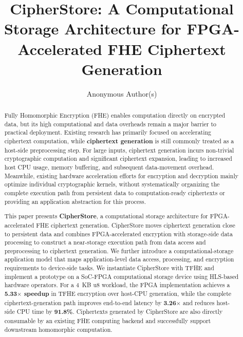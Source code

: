 \documentclass[sigconf,anonymous]{acmart}
\begin{document}
\title{CipherStore: A Computational Storage Architecture for FPGA-Accelerated FHE Ciphertext Generation}

\author{Anonymous Author(s)}

\begin{abstract}
Fully Homomorphic Encryption (FHE) enables computation directly on encrypted data, but its high computational and data overheads remain a major barrier to practical deployment. Existing research has primarily focused on accelerating ciphertext computation, while \textbf{ciphertext generation} is still commonly treated as a host-side preprocessing step. For large inputs, ciphertext generation incurs non-trivial cryptographic computation and significant ciphertext expansion, leading to increased host CPU usage, memory buffering, and subsequent data-movement overhead. Meanwhile, existing hardware acceleration efforts for encryption and decryption mainly optimize individual cryptographic kernels, without systematically organizing the complete execution path from persistent data to computation-ready ciphertexts or providing an application abstraction for this process.

This paper presents \textbf{CipherStore}, a computational storage architecture for FPGA-accelerated FHE ciphertext generation. CipherStore moves ciphertext generation close to persistent data and combines FPGA-accelerated encryption with storage-side data processing to construct a near-storage execution path from data access and preprocessing to ciphertext generation. We further introduce a computational-storage application model that maps application-level data access, processing, and encryption requirements to device-side tasks. We instantiate CipherStore with TFHE and implement a prototype on a SoC-FPGA computational storage device using HLS-based hardware operators. For a 4~KB u8 workload, the FPGA implementation achieves a \textbf{5.33$\times$ speedup} in TFHE encryption over host-CPU generation, while the complete ciphertext-generation path improves end-to-end latency by \textbf{3.26$\times$} and reduces host-side CPU time by \textbf{91.8\%}. Ciphertexts generated by CipherStore are also directly consumable by an existing FHE computing backend and successfully support downstream homomorphic computation.
\end{abstract}


\maketitle
\end{document}
